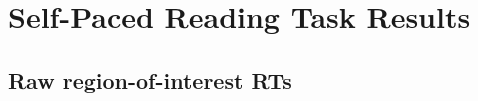 
\chapter{Self-Paced Reading Task Results}\label{app-results-spr}

\section{Raw region-of-interest RTs}\label{app-spr-rt}



